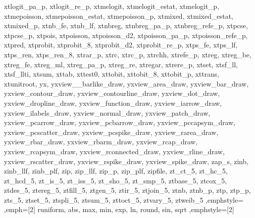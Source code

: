 {{    xtlogit_pa_p, xtlogit_re_p, xtmelogit, xtmelogit_estat, xtmelogit_p, xtmepoisson, xtmepoisson_estat, xtmepoisson_p, xtmixed, xtmixed_estat, xtmixed_p, xtnb_fe, xtnb_lf, xtnbreg, xtnbreg_pa_p, xtnbreg_refe_p, xtpcse,
    xtpcse_p, xtpois, xtpoisson, xtpoisson_d2, xtpoisson_pa_p, xtpoisson_refe_p, xtpred, xtprobit, xtprobit_8, xtprobit_d2, xtprobit_re_p, xtps_fe, xtps_lf, xtps_ren, xtps_ren_8, xtrar_p, xtrc, xtrc_p, xtrchh, xtrefe_p,
    xtreg, xtreg_be, xtreg_fe, xtreg_ml, xtreg_pa_p, xtreg_re, xtregar, xtrere_p, xtset, xtsf_ll, xtsf_llti, xtsum, xttab, xttest0, xttobit, xttobit_8, xttobit_p, xttrans, xtunitroot, yx, yxview__barlike_draw,
    yxview_area_draw, yxview_bar_draw, yxview_contour_draw, yxview_contourline_draw, yxview_dot_draw, yxview_dropline_draw, yxview_function_draw, yxview_iarrow_draw, yxview_ilabels_draw, yxview_normal_draw,
    yxview_patch_draw, yxview_pcarrow_draw, yxview_pcbarrow_draw, yxview_pccapsym_draw, yxview_pcscatter_draw, yxview_pcspike_draw, yxview_rarea_draw, yxview_rbar_draw, yxview_rbarm_draw, yxview_rcap_draw,
    yxview_rcapsym_draw, yxview_rconnected_draw, yxview_rline_draw, yxview_rscatter_draw, yxview_rspike_draw, yxview_spike_draw, zap_s, zinb, zinb_llf, zinb_plf, zip, zip_llf, zip_p, zip_plf, zipfile, zt_ct_5, zt_hc_5,
    zt_hcd_5, zt_is_5, zt_iss_5, zt_sho_5, zt_smp_5, ztbase_5, ztcox_5, ztdes_5, ztereg_5, ztfill_5, ztgen_5, ztir_5, ztjoin_5, ztnb, ztnb_p, ztp, ztp_p, zts_5, ztset_5, ztspli_5, ztsum_5, zttoct_5, ztvary_5, ztweib_5
    },emphstyle={\color{Statakeywords}}%
    ,emph={[2]%
    runiform, abs, max, min, exp, ln, round, sin, sqrt %
    },emphstyle={[2]\color{Statafunction}}%
}